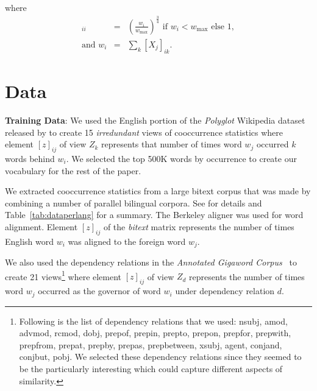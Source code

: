 \documentclass[11pt]{article}
\newcommand{\xline}[0]{\noindent\underline{\makebox[0.1cm][l]{}}}
\newcommand{\remove}[1]{}
\begin{document}
where
\begin{eqnarray}
[W_j]_{ii} &=& \left(\frac{w_i}{w_{\max}}\right)^{\frac{3}{4}} \text{ if } w_i <
  w_{\max} \text{ else } 1, \nonumber \\
  \text{and } w_i &=&  \sum_k [X_j]_{ik}. \nonumber
\end{eqnarray}


\section{Data}
\label{sec:data}

\noindent\textbf{Training Data}: We used the English portion of the \textit{Polyglot} Wikipedia dataset
released by  to create 15 \emph{irredundant} views of
cooccurrence statistics where element $[z]_{ij}$ of view $Z_k$
represents that number of times word $w_j$ occurred $k$ words behind
$w_i$. \remove{We lowercased all the words and discarded all
words which were longer than 5 characters and contained more than 3 non
alphabetical symbols. This was done to preserves years and smaller
numbers.}
We selected the top 500K words by occurrence to 
create our vocabulary for the rest of the paper.

We extracted cooccurrence statistics from a large bitext corpus that was made by combining a
number of parallel bilingual corpora. See \cite{ganitkevitch2013ppdb} for details and
Table~\ref{tab:dataperlang} for a summary. The Berkeley aligner was used for word alignment. Element
$[z]_{ij}$ of the \textit{bitext} matrix represents the number of times English
word $w_i$ was aligned to the foreign word $w_j$.

We also used the dependency relations in the \textit{Annotated
  Gigaword Corpus}~\cite{annotatedGigaword12} to create 21
views\footnote{Following is the list of dependency relations that we
  used: nsubj, amod, advmod, rcmod, dobj, prep\xline{}of,
  prep\xline{}in, prep\xline{}to, prep\xline{}on, prep\xline{}for,
  prep\xline{}with, prep\xline{}from, prep\xline{}at, prep\xline{}by,
  prep\xline{}as, prep\xline{}between, xsubj, agent, conj\xline{}and,
  conj\xline{}but, pobj. We selected these dependency relations since
  they seemed to be the particularly interesting which could capture
  different aspects of similarity.}  where element $[z]_{ij}$ of view
$Z_d$ represents the number of times word $w_j$ occurred
as the governor of word $w_i$ under dependency relation $d$.
\end{document}

